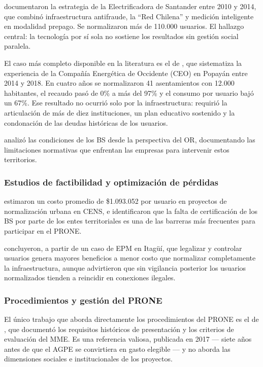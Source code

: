 \textcite{MendezFuentes2013} documentaron la estrategia de la Electrificadora de Santander entre 2010 y 2014, que combinó infraestructura antifraude, la ``Red Chilena'' y medición inteligente en modalidad prepago. Se normalizaron más de 110.000 usuarios. El hallazgo central: la tecnología por sí sola no sostiene los resultados sin gestión social paralela.

El caso más completo disponible en la literatura es el de \textcite{SerranoRueda2019}, que sistematiza la experiencia de la Compañía Energética de Occidente (CEO) en Popayán entre 2014 y 2018. En cuatro años se normalizaron 41 asentamientos con 12.000 habitantes, el recaudo pasó de 0\% a más del 97\% y el consumo por usuario bajó un 67\%. Ese resultado no ocurrió solo por la infraestructura: requirió la articulación de más de diez instituciones, un plan educativo sostenido y la condonación de las deudas históricas de los usuarios.

\textcite{VillagranRomero2022} analizó las condiciones de los BS desde la perspectiva del OR, documentando las limitaciones normativas que enfrentan las empresas para intervenir estos territorios.

\subsubsection{Estudios de factibilidad y optimización de pérdidas}

\textcite{CabralesSanjuan2015} estimaron un costo promedio de \$1.093.052 por usuario en proyectos de normalización urbana en CENS, e identificaron que la falta de certificación de los BS por parte de los entes territoriales es una de las barreras más frecuentes para participar en el PRONE.

\textcite{PenaMantilla2020} concluyeron, a partir de un caso de EPM en Itagüí, que legalizar y controlar usuarios genera mayores beneficios a menor costo que normalizar completamente la infraestructura, aunque advirtieron que sin vigilancia posterior los usuarios normalizados tienden a reincidir en conexiones ilegales.

\subsubsection{Procedimientos y gestión del PRONE}

El único trabajo que aborda directamente los procedimientos del PRONE es el de \textcite{AriasArias2017}, que documentó los requisitos históricos de presentación y los criterios de evaluación del MME. Es una referencia valiosa, publicada en 2017 — siete años antes de que el AGPE se convirtiera en gasto elegible — y no aborda las dimensiones sociales e institucionales de los proyectos.

